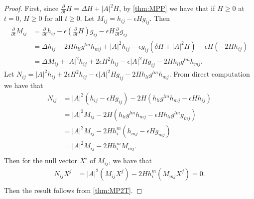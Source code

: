 \documentclass[a4paper]{report}
\theoremstyle{remark}
\begin{document}
\begin{proof}
	First, since $\frac{\partial }{\partial t} H=\Delta H+ \left| A \right| ^2 H$, by \autoref{thm:MPP} we have that if $H \geq 0$ at $t=0$, $H \geq 0$ for all $t \geq 0$.
	Let $M_{ij }^{} = h_{ij }^{} - \epsilon H g_{ij }^{} .$ Then
	\begin{equation*}
	\begin{split}
		\frac{\partial }{\partial t} M_{ij }^{}  
	&= \frac{\partial }{\partial t} h_{ij }^{} -\epsilon (\frac{\partial }{\partial t} H) g_{ij }^{} - \epsilon H \frac{\partial }{\partial t} g_{ij }^{}  \\
	&= \Delta h_{ij}^{} - 2 H h_{li }^{} g_{}^{lm } h_{mj}^{} + \left| A \right| ^2 h_{ij}^{}-\epsilon g_{ij }^{} (\delta H+ \left| A \right| ^2 H)-\epsilon H(-2H h_{ij }^{} )\\
	&= \Delta M_{ij }^{} + \left| A \right| ^{2}h_{ij }^{} + 2 \epsilon H^2 h_{ij }^{} - \epsilon \left| A \right| ^2 H g_{ij }^{} - 2 H h_{li }^{} g_{}^{lm } h_{mj}^{}.
	\end{split}
	\end{equation*}
	Let $N_{ij }^{} = \left| A \right| ^{2}h_{ij }^{} + 2 \epsilon H^2 h_{ij }^{} - \epsilon \left| A \right| ^2 H g_{ij }^{} - 2 H h_{li }^{} g_{}^{lm } h_{mj}^{}$. From direct computation we have that 
	\begin{equation*}
	\begin{split}
		N_{ij }^{} 
		&= \left| A \right| ^2(h_{ij }^{} -\epsilon H g_{ij }^{} )-2H(h_{li }^{} g_{}^{lm } h_{mj}^{}-\epsilon H h_{ij }^{} )\\
		&= \left|A \right| ^2 M_{ij }^{} -2H(h_{li }^{} g_{}^{lm } h_{mj}^{}-\epsilon H h_{li }^{} g_{}^{lm} g_{mj }^{} )\\
		&= \left|A \right| ^2 M_{ij }^{} -2H h_{i}^{m} (h_{mj }^{}-\epsilon H  g_{mj }^{} )\\
		&= \left|A \right| ^2 M_{ij }^{} -2H h_{i}^{m} M_{ mj}^{}. \\
	\end{split}
	\end{equation*}  
	Then for the null vector $X^i$ of $M_{ij }^{} $, we have that
	\begin{equation*}
	\begin{split}
		N_{ij }^{} X^j 
	&= \left|A \right| ^2 (M_{ij }^{}X^j) -2H h_{i}^{m} (M_{ mj}^{} X^j)=0.\\
	\end{split}
	\end{equation*}
	Then the result follows from \autoref{thm:MP2T}.
\end{proof}
\end{document}

